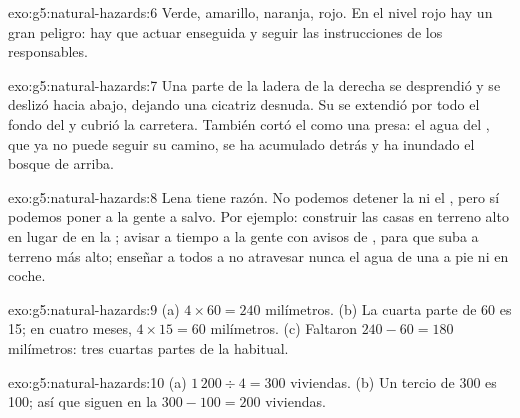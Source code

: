 \begin{solution}{exo:g5:natural-hazards:6}
Verde, amarillo, naranja, rojo. En el nivel rojo hay un gran peligro: hay
que actuar enseguida y seguir las instrucciones de los responsables.
\end{solution}

\begin{solution}{exo:g5:natural-hazards:7}
Una parte de la ladera de la derecha se desprendió y se deslizó hacia abajo,
dejando una cicatriz desnuda. Su  se extendió por todo el fondo del
 y cubrió la carretera. También cortó el  como una presa: el agua
del , que ya no puede seguir su camino, se ha acumulado detrás y ha
inundado el bosque de  arriba.
\end{solution}

\begin{solution}{exo:g5:natural-hazards:8}
Lena tiene razón. No podemos detener la  ni el , pero sí podemos
poner a la gente a salvo. Por ejemplo: construir las casas en terreno alto
en lugar de en la ; avisar a tiempo a la gente con
avisos de , para que suba a terreno más alto; enseñar a todos a
no atravesar nunca el agua de una  a pie ni en coche.
\end{solution}

\begin{solution}{exo:g5:natural-hazards:9}
(a) $4 \times 60 = 240$ milímetros. (b) La cuarta parte de 60 es 15; en
cuatro meses, $4 \times 15 = 60$ milímetros. (c) Faltaron
$240 - 60 = 180$ milímetros: tres cuartas partes de la  habitual.
\end{solution}

\begin{solution}{exo:g5:natural-hazards:10}
(a) $1\,200 \div 4 = 300$ viviendas. (b) Un tercio de 300 es 100; así que
siguen en la  $300 - 100 = 200$ viviendas.
\end{solution}

